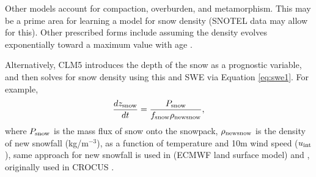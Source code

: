 \documentclass[twoside,10pt]{report}
\begin{document}
Other models account for compaction, overburden, and metamorphism. This may be a prime area for learning a model for snow density (SNOTEL data may allow for this). Other prescribed forms include assuming the density evolves exponentially toward a maximum value with age \citep{Verseghy1991,Dutra_Balsamo_2010}.

Alternatively, CLM5 introduces the depth of the snow as a prognostic variable, and then solves for snow density using this and SWE via Equation \eqref{eq:swe1}. For example, 
\begin{equation}
\frac{d z_{\rm snow}}{d t} = \frac{P_{\rm snow}}{f_{\rm snow}\rho_{\rm newsnow}},
\end{equation}
where $P_{\rm snow}$ is the mass flux of snow onto the snowpack,  $\rho_{\rm newsnow}$ is the density of new snowfall (kg/m$^{-3}$), as a function of temperature and 10m wind speed ($u_{\rm int}$), same approach for new snowfall is used in \citet{Dutra_Balsamo_2010} (ECMWF land surface model) and \citet{Boone_Etchevers_2001}, originally used in CROCUS \citep{Brun1989,Brun1992}.
 
 


\end{document}
